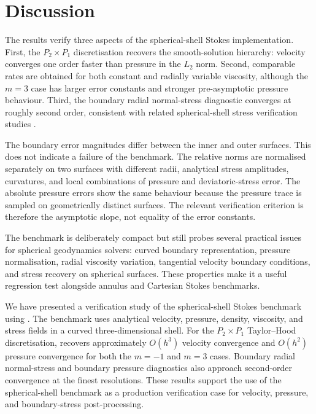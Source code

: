\documentclass[gmd, manuscript]{copernicus}
\begin{document}
\section{Discussion}

The results verify three aspects of the 
spherical-shell Stokes implementation. First, the \(P_2\times P_1\)
discretisation recovers the smooth-solution hierarchy: velocity converges one
order faster than pressure in the \(L_2\) norm. Second, comparable rates are
obtained for both constant and radially variable viscosity, although the
\(m=3\) case has larger error constants and stronger pre-asymptotic pressure
behaviour. Third, the boundary radial normal-stress diagnostic converges at
roughly second order, consistent with related spherical-shell stress
verification studies \citep{kramer2021}.

The boundary error magnitudes differ between the inner and outer surfaces. This
does not indicate a failure of the benchmark. The relative norms are normalised
separately on two surfaces with different radii, analytical stress amplitudes,
curvatures, and local combinations of pressure and deviatoric-stress error. The
absolute pressure errors show the same behaviour because the pressure trace is
sampled on geometrically distinct surfaces. The relevant verification criterion
is therefore the asymptotic slope, not equality of the error constants.

The benchmark is deliberately compact but still probes several practical issues
for spherical geodynamics solvers: curved boundary representation, pressure
normalisation, radial viscosity variation, tangential velocity boundary
conditions, and stress recovery on spherical surfaces. These properties make it
a useful regression test alongside annulus and Cartesian Stokes benchmarks.

\conclusions

We have presented a verification study of the 
spherical-shell Stokes benchmark using . The benchmark
uses analytical velocity, pressure, density, viscosity, and stress fields in a
curved three-dimensional shell. For the \(P_2\times P_1\) Taylor--Hood
discretisation,  recovers approximately \(O(h^3)\)
velocity convergence and \(O(h^2)\) pressure convergence for both the \(m=-1\)
and \(m=3\) cases. Boundary radial normal-stress and boundary pressure
diagnostics also approach second-order convergence at the finest resolutions.
These results support the use of the  spherical-shell
benchmark as a production verification case for 
velocity, pressure, and boundary-stress post-processing.



\end{document}

